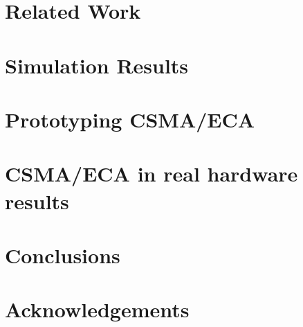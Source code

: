 \documentclass[a4paper,journal]{IEEEtran}
\begin{document}


\section{Related Work}\label{relatedWork}
\section{Simulation Results}\label{simulations}
\section{Prototyping CSMA/ECA}\label{prototype}
\section{CSMA/ECA in real hardware results}\label{prototypeResults}
\section{Conclusions}\label{conclusions}
\section{Acknowledgements}




\end{document}
